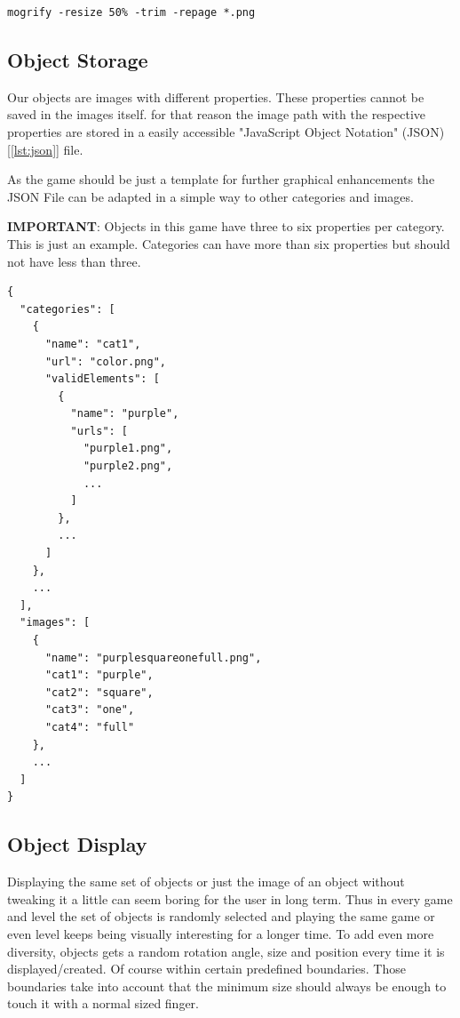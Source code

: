 \begin{lstlisting}[style=TypeScript, caption={ImageMagick console command "mogrify"}, label={lst:mogrify}]
    mogrify -resize 50% -trim -repage *.png
\end{lstlisting}

\subsection{Object Storage}\label{subsec:object-storage}
Our objects are images with different properties.
These properties cannot be saved in the images itself.
for that reason the image path with the respective properties are stored in a easily accessible
"JavaScript Object Notation" (JSON) [\ref{lst:json}] file.

As the game should be just a template for further graphical enhancements the JSON File can be adapted in a simple way
to other categories and images.

\textbf{IMPORTANT}: Objects in this game have three to six properties per category. This is just an example.
Categories can have more than six properties but should not have less than three.

\begin{lstlisting}[style=TypeScript, caption={JavaScript Object Notation File (geometrical\_objects.json)}, label={lst:json}]
{
  "categories": [
    {
      "name": "cat1",
      "url": "color.png",
      "validElements": [
        {
          "name": "purple",
          "urls": [
            "purple1.png",
            "purple2.png",
            ...
          ]
        },
        ...
      ]
    },
    ...
  ],
  "images": [
    {
      "name": "purplesquareonefull.png",
      "cat1": "purple",
      "cat2": "square",
      "cat3": "one",
      "cat4": "full"
    },
    ...
  ]
}
\end{lstlisting}

\subsection{Object Display}\label{subsec:object-display}
Displaying the same set of objects or just the image of an object without tweaking it a little can seem boring for the user in long term.
Thus in every game and level the set of objects is randomly selected
and playing the same game or even level keeps being visually interesting for a longer time.
To add even more diversity, objects gets a random rotation angle, size and position every time it is displayed/created.
Of course within certain predefined boundaries.
Those boundaries take into account that the minimum size should always be enough to touch it with a normal sized finger.

